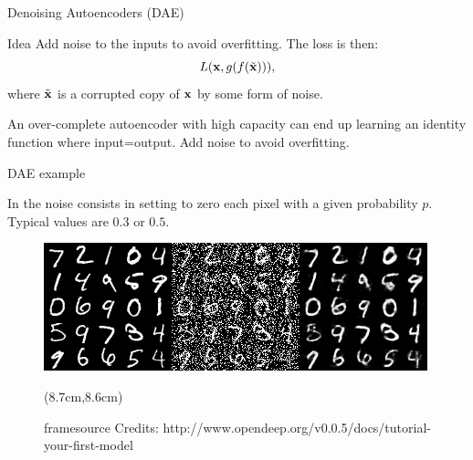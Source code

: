 \documentclass[xcolor=pdftex,dvipsnames,table,mathserif]{beamer}
\newcommand{\source}[1]{\begin{textblock*}{4cm}(8.7cm,8.6cm)
    \begin{beamercolorbox}[ht=0.5cm,right]{framesource}
      \usebeamerfont{framesource}\usebeamercolor[fg]{framesource} Credits: {#1}
    \end{beamercolorbox}
\end{textblock*}}
\begin{document}
\begin{frame}{Denoising Autoencoders (DAE)\cite{vincent2008extracting}}

  \begin{block}{Idea}
  Add noise to the inputs to avoid overfitting. The loss is then:
  \begin{equation}
L ( \mathbf{x} , g(f(\tilde{\mathbf{x}}))),
\end{equation}
where $\tilde{\mathbf{x}}$ is a corrupted copy of $\mathbf{x}$ by some form of noise.
  \end{block}

\begin{figure}
\end{figure}

An over-complete autoencoder with high capacity can end up learning an
identity function where input=output. Add noise to avoid overfitting.

\end{frame}


\begin{frame}{DAE example}

  In \cite{vincent2008extracting} the noise consists in setting to zero each pixel with a given probability $p$. Typical values are $0.3$ or $0.5$.

\begin{figure}[ht]
  \centering
  \includegraphics[width=\textwidth]{../graphics/dae_mnist}
  \source{http://www.opendeep.org/v0.0.5/docs/tutorial-your-first-model}
\end{figure}



\end{frame}
\end{document}
